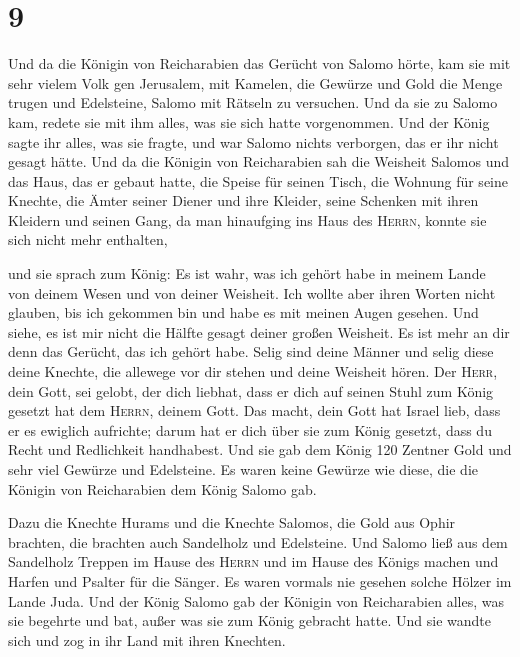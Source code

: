 \hypertarget{section-8}{%
\section{9}\label{section-8}}

 Und da die Königin von Reicharabien das Gerücht von
Salomo hörte, kam sie mit sehr vielem Volk gen Jerusalem, mit Kamelen,
die Gewürze und Gold die Menge trugen und Edelsteine, Salomo mit Rätseln
zu versuchen. Und da sie zu Salomo kam, redete sie mit ihm alles, was
sie sich hatte vorgenommen.  Und der König sagte ihr
alles, was sie fragte, und war Salomo nichts verborgen, das er ihr nicht
gesagt hätte.  Und da die Königin von Reicharabien sah die
Weisheit Salomos und das Haus, das er gebaut hatte,  die
Speise für seinen Tisch, die Wohnung für seine Knechte, die Ämter seiner
Diener und ihre Kleider, seine Schenken mit ihren Kleidern und seinen
Gang, da man hinaufging ins Haus des \textsc{Herrn}, konnte sie sich
nicht mehr enthalten,

 und sie sprach zum König: Es ist wahr, was ich gehört
habe in meinem Lande von deinem Wesen und von deiner Weisheit.
 Ich wollte aber ihren Worten nicht glauben, bis ich
gekommen bin und habe es mit meinen Augen gesehen. Und siehe, es ist mir
nicht die Hälfte gesagt deiner großen Weisheit. Es ist mehr an dir denn
das Gerücht, das ich gehört habe.  Selig sind deine Männer
und selig diese deine Knechte, die allewege vor dir stehen und deine
Weisheit hören.  Der \textsc{Herr}, dein Gott, sei gelobt,
der dich liebhat, dass er dich auf seinen Stuhl zum König gesetzt hat
dem \textsc{Herrn}, deinem Gott. Das macht, dein Gott hat Israel lieb,
dass er es ewiglich aufrichte; darum hat er dich über sie zum König
gesetzt, dass du Recht und Redlichkeit handhabest.  Und
sie gab dem König 120 Zentner Gold und sehr viel Gewürze und Edelsteine.
Es waren keine Gewürze wie diese, die die Königin von Reicharabien dem
König Salomo gab.

 Dazu die Knechte Hurams und die Knechte Salomos, die
Gold aus Ophir brachten, die brachten auch Sandelholz und Edelsteine.
 Und Salomo ließ aus dem Sandelholz Treppen im Hause des
\textsc{Herrn} und im Hause des Königs machen und Harfen und Psalter für
die Sänger. Es waren vormals nie gesehen solche Hölzer im Lande Juda.
 Und der König Salomo gab der Königin von Reicharabien
alles, was sie begehrte und bat, außer was sie zum König gebracht hatte.
Und sie wandte sich und zog in ihr Land mit ihren Knechten.

